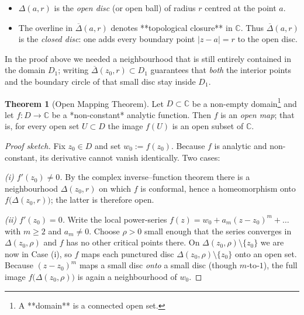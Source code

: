 \documentclass[12pt]{article}
\theoremstyle{definition} %
\newtheorem{theorem}{Theorem}
\theoremstyle{plain} %
\begin{document}
       \begin{itemize}
         \item \(\Delta(a,r)\) is the \emph{open disc} (or open ball) of radius \(r\)
               centred at the point \(a\).
         \item The overline in \(\overline{\Delta}(a,r)\) denotes **topological closure** in
               \(\mathbb{{C}}\).
               Thus \(\overline{\Delta}(a,r)\) is the \emph{closed disc}:
               one adds every boundary point \(|z-a|=r\) to the open disc.
       \end{itemize}
       
       In the proof above we needed a neighbourhood that is still entirely
       contained in the domain \(D_{1}\); writing
       \(\overline{\Delta}(z_{0},r)\subset D_{1}\) guarantees that
       \emph{both} the interior points and the boundary circle of that small disc
       stay inside \(D_{1}\). 
       \begin{theorem}[Open Mapping Theorem]
        Let $D\subset\mathbb{{C}}$ be a non-empty domain\footnote{A **domain** is a connected open set.} and
        let $f:D\longrightarrow\mathbb{{C}}$ be a *non-constant* analytic function.
        Then $f$ is an \emph{open map}; that is, for every open set
        $U\subset D$ the image $f(U)$ is an open subset of $\mathbb{{C}}$.
        \end{theorem}
        
        \begin{proof}[Proof sketch]
        Fix $z_{0}\in D$ and set $w_{0}:=f(z_{0})$.
        Because $f$ is analytic and non-constant, its derivative cannot vanish
        identically.  Two cases:
        
        \smallskip
        \emph{(i) $f'(z_{0})\neq0$.}\;
        By the complex inverse–function theorem
        there is a neighbourhood $\Delta(z_{0},r)$ on which $f$ is
        conformal, hence a homeomorphism onto
        $f\bigl(\Delta(z_{0},r)\bigr)$; the latter is therefore open.
        
        \smallskip
        \emph{(ii) $f'(z_{0})=0$.}\;
        Write the local power-series
        $f(z)=w_{0}+a_{m}(z-z_{0})^{m}+\dots$ with $m\ge2$ and $a_{m}\neq0$.
        Choose $\rho>0$ small enough that the series converges in
        $\Delta(z_{0},\rho)$ and $f$ has no other critical points there.
        On $\Delta(z_{0},\rho)\setminus\{z_{0}\}$ we are now in Case (i),
        so $f$ maps each punctured disc
        $\Delta(z_{0},\rho)\setminus\{z_{0}\}$ onto an open set.
        Because $(z-z_{0})^{m}$ maps a small disc \emph{onto} a
        small disc (though $m$‐to‐$1$), the full image
        $f\bigl(\Delta(z_{0},\rho)\bigr)$ is again a neighbourhood of $w_{0}$.
        \end{proof}
        
\end{document}
